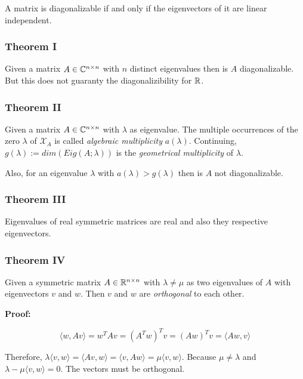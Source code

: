 A matrix is diagonalizable if and only if the eigenvectors of it are linear independent.

\subsubsection{Theorem I}

Given a matrix \(A \in \mathbb{C}^{n \times n}\) with \(n\) distinct eigenvalues then is \(A\)
diagonalizable. But this does not guaranty the diagonalizibility for \(\mathbb{R}\).

\subsubsection{Theorem II}

Given a matrix \(A \in \mathbb{C}^{n \times n}\) with \(\lambda\) as eigenvalue. The multiple occurrences 
of the zero \(\lambda\) of \(\mathcal{X}_A\) is called \emph{algebraic multiplicity} \(a(\lambda)\). 
Continuing, \(g(\lambda):= dim(Eig(A;\lambda))\) is the \emph{geometrical multiplicity} of \(\lambda\).
\vspace{\baselineskip}

Also, for an eigenvalue \(\lambda\) with \(a(\lambda) > g(\lambda)\) then is \(A\) not diagonalizable.

\subsubsection{Theorem III}

Eigenvalues of real symmetric matrices are real and also they respective eigenvectors.

\subsubsection{Theorem IV}

Given a symmetric matrix \(A \in \mathbb{R}^{n \times n}\) with \(\lambda \ne \mu \) as two eigenvalues of \(A\) 
with eigenvectors \(v\) and \(w\). Then \(v\) and \(w\) are \emph{orthogonal} to each other.
\vspace{\baselineskip}

\textbf{Proof:}

\[
    \langle w, Av \rangle = w^{T} Av = (A^T w)^T v = (Aw)^T v = \langle Aw, v\rangle
\]

Therefore, \(\lambda \langle v, w \rangle = \langle Av, w \rangle = \langle v, Aw\rangle 
= \mu \langle v, w \rangle\). Because \(\mu \ne \lambda\) and \(\lambda - \mu \langle v, w\rangle = 0\).
The vectors must be orthogonal.

